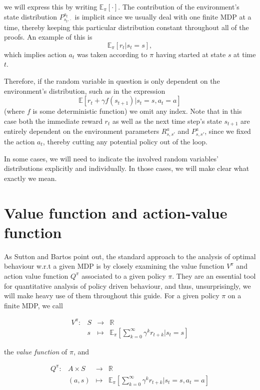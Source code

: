 \documentclass[11pt]{article} %
\begin{document}
we will express this by writing $\mathbb{E}_{\pi}[\cdot]$. The contribution of the environment's state distribution $P^{a_t}_{s_t.\cdot}$ is implicit since we usually deal with one finite MDP at a time, thereby keeping this particular distribution constant throughout all of the proofs. An example of this is $$\mathbb{E}_{\pi}[r_t | s_t = s],$$ which implies action $a_t$ was taken according to $\pi$ having started at state $s$ at time $t$.

Therefore, if the random variable in question is only dependent on the environment's distribution, such as in the expression $$\mathbb{E}[r_t + \gamma f(s_{t+1}) | s_t = s, a_t = a]$$ (where $f$ is some deterministic function) we omit any index. Note that in this case both the immediate reward $r_t$ as well as the next time step's state $s_{t+1}$ are entirely dependent on the environment parameters $R^a_{s,s'}$ and $P^a_{s,s'}$, since we fixed the action $a_t$, thereby cutting any potential policy out of the loop.

In some cases, we will need to indicate the involved random variables' distributions explicitly and individually. In those cases, we will make clear what exactly we mean.

\section{Value function and action-value function}

As Sutton and Bartos point out, the standard approach to the analysis of optimal behaviour w.r.t a given MDP is by closely examining the value function $V^{\pi}$ and action value function $Q^{\pi}$ associated to a given policy $\pi$. They are an essential tool for quantitative analysis of policy driven behaviour, and thus, unsurprisingly, we will make heavy use of them throughout this guide. For a given policy $\pi$ on a finite MDP, we call

\begin{equation}\label{ar_valFunc}
	\begin{array}{llll}
		V^{\pi} :	& S 	& \to 	& \mathbb{R} \\
				& s	& \mapsto	& \mathbb{E}_{\pi}[\sum_{k=0}^{\infty} \gamma^k r_{t+k} | s_t = s]
	\end{array}
\end{equation}

the \textit{value function} of $\pi$, and 

\begin{equation}\label{ar_actValFunc}
	\begin{array}{llll}
		Q^{\pi} : 	& A \times S 	& \to 	& \mathbb{R} \\
				& (a,s)		& \mapsto	& \mathbb{E}_{\pi}[\sum_{k=0}^{\infty} \gamma^k r_{t+k} | s_t = s, a_t = a]
	\end{array}
\end{equation}
\end{document}
